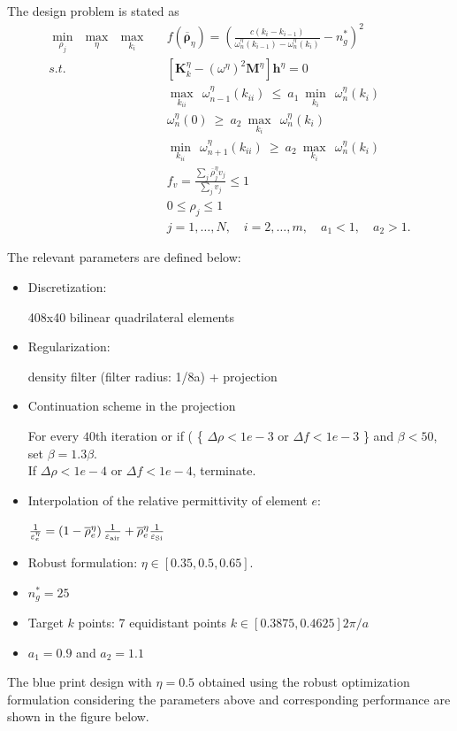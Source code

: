\documentclass{article}
\begin{document}
The design problem is stated as
\begin{eqnarray}
	\min_{\rho_j} \ \ \max_{\eta}\ \ \max_{k_i} && f\left(\overline{\boldsymbol{\rho}}_\eta\right)= \left(\frac{c\left(k_i-k_{i-1}\right)}{{\omega}^{\eta}_n\left(k_{i-1}\right)-{\omega}^{\eta}_n\left(k_i\right)}-n^*_g\right)^2 \nonumber \\
	s.t.  && \left[ \mathbf{K}^{\eta}_k - \left({\omega}^{\eta} \right)^2 \mathbf{M}^{\eta} \right]\mathbf{h}^{\eta}=0  \nonumber \\
	&&  \max_{k_{ii}} \ \  {{\omega}^{\eta}_{n-1}\left(k_{ii}\right)} \  \leq \ a_1 \  \min_{k_i} \ \ {{\omega}^{\eta}_n\left(k_i\right)} \nonumber \\
	&&   {{\omega}^{\eta}_{n}\left(0\right)} \  \geq \ a_2 \ \max_{k_i} \ \ {{\omega}^{\eta}_n\left(k_i\right)}  \nonumber \\
	&& \min_{k_{ii}} \ \  {{\omega}^{\eta}_{n+1}\left(k_{ii}\right)} \  \geq \ a_2 \ \max_{k_i} \ \ {{\omega}^{\eta}_n\left(k_i\right)} \nonumber \\
	&&  f_v =\frac{\sum_{j} \overline{\rho}^{\eta}_j v_j}{\sum_{j} v_j }\leq 1 \nonumber \\
	&&   0\leq \rho_j \leq 1 \nonumber\\
	&& j=1,\ldots,N, \quad i=2,\ldots,m, \quad a_1 < 1, \quad a_2>1 . 
\end{eqnarray} 

The relevant parameters are defined below:
 
\begin{itemize}
	\item Discretization:
	
	 408x40 bilinear quadrilateral elements
	
\item 	Regularization: 

	density filter (filter radius: 1/8a) + projection
	\item Continuation scheme in the projection
	
	 For every $40$th iteration or if ( \{ $\Delta \rho< 1e-3$ or $\Delta f <1e-3$ \} and $\beta < 50$,   set $\beta=1.3 \beta$.  \\
  If $\Delta \rho < 1e-4$ or $\Delta f < 1e-4 $,  terminate. 

\item Interpolation of the relative permittivity of element $e$: 

$\frac{1}{\varepsilon^{\eta}_e} = \left(1- \overline{\rho}^{\eta}_e \right)\frac{1}{\varepsilon_{\rm{air}}} +\overline{\rho}^{\eta}_e  \frac{1}{\varepsilon_{\rm{Si}}}$
\item 	Robust formulation: $ \eta \in [0.35, 0.5, 0.65]$.

\item $n^*_g=25$
\item Target $k$ points:
7  equidistant points $k \in [0.3875, 0.4625]2{\pi}/a$ 
\item $a_1=0.9$ and $a_2=1.1$
\end{itemize}
The blue print design  with $\eta=0.5$ obtained using the robust optimization formulation considering the parameters above and corresponding performance are shown in the figure below. 
 
\end{document}
